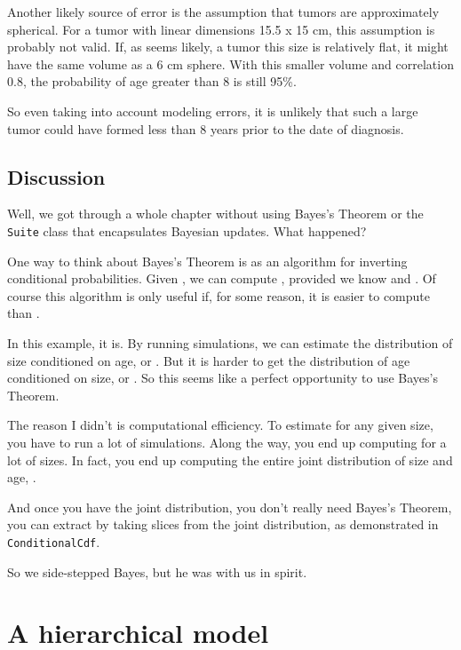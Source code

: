 \documentclass[12pt]{book}
\begin{document}
Another likely source of error is the assumption that tumors are
approximately spherical.  For a tumor with linear dimensions 15.5 x 15
cm, this assumption is probably not valid.  If, as seems likely, a
tumor this size
is relatively flat, it might have the same volume as a 6 cm sphere.
With this smaller volume and correlation 0.8, the probability of age
greater than 8 is still 95\%.

So even taking into account modeling errors, it is unlikely that such
a large tumor could have formed less than 8 years prior to the date of
diagnosis.


\section{Discussion}

Well, we got through a whole chapter without using Bayes's Theorem or
the {\tt Suite} class that encapsulates Bayesian updates.  What
happened?

One way to think about Bayes's Theorem is as an algorithm for
inverting conditional probabilities.  Given , we can compute
, provided we know  and .  Of course this algorithm
is only useful if, for some reason, it is easier to compute 
than .

In this example, it is.  By running simulations, we can estimate the
distribution of size conditioned on age, or .  But it is
harder to get the distribution of age conditioned on size, or
.  So this seems like a perfect opportunity to use Bayes's
Theorem.

The reason I didn't is computational efficiency.  To estimate
 for any given size, you have to run a lot of simulations.
Along the way, you end up computing  for a lot of sizes.
In fact, you end up computing the entire joint distribution of size
and age, .

And once you have the joint distribution, you don't really need
Bayes's Theorem, you can extract  by taking slices from
the joint distribution, as demonstrated in {\tt ConditionalCdf}.

So we side-stepped Bayes, but he was with us in spirit.


\chapter{A hierarchical model}
\label{hierarchical}
\end{document}
